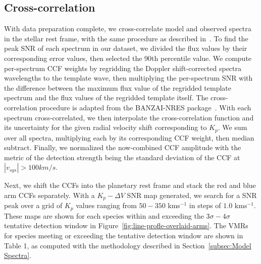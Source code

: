 \documentclass[twocolumn]{aastex631}
\begin{document}
        \subsection{Cross-correlation}
            With data preparation complete, we cross-correlate model and observed spectra in the stellar rest frame, with the same procedure as described in~\citet{Johnson2023}. To find the peak SNR of each spectrum in our dataset, we divided the flux values by their corresponding error values, then selected the 90th percentile value. We compute per-spectrum CCF weights by regridding the Doppler shift-corrected spectra wavelengths to the template wave, then multiplying the per-spectrum SNR with the difference between the maximum flux value of the regridded template spectrum and the flux values of the regridded template itself. The cross-correlation procedure is adapted from the BANZAI-NRES package~\citep{McCully2022}. With each spectrum cross-correlated, we then interpolate the cross-correlation function and its uncertainty for the given radial velocity shift corresponding to $K_p$. We sum over all spectra, multiplying each by its corresponding CCF weight, then median subtract. Finally, we normalized the now-combined CCF amplitude with the metric of the detection strength being the standard deviation of the CCF at $|v_{sys}| > 100 km/s$.
            
            Next, we shift the CCFs into the planetary rest frame and stack the red and blue arm CCFs separately. With a ${K_p-\Delta\!V}$ SNR map generated, we search for a SNR peak over a grid of $K_p$ values ranging from $50-350$ kms$^{-1}$ in steps of $1.0$ kms$^{-1}$. These maps are shown for each species within and exceeding the ${3\sigma}-{4\sigma}$ tentative detection window in Figure~\ref{fig:line-profle-overlaid-arms}. The VMRs for species meeting or exceeding the tentative detection window are shown in Table 1, as computed with the methodology described in Section~\ref{subsec:Model Spectra}.
            
\end{document}
